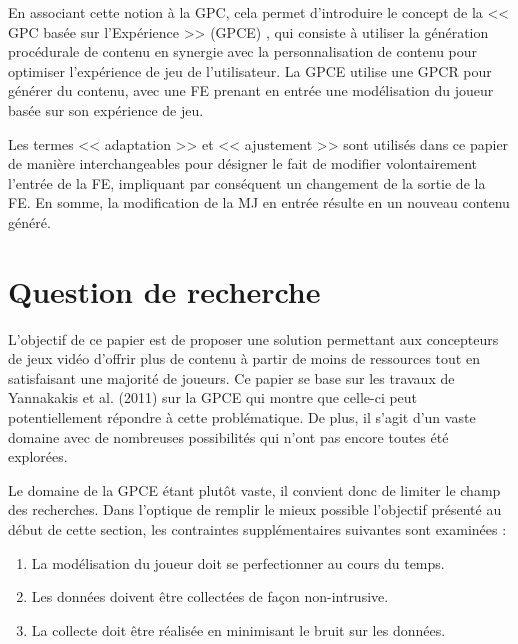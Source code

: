 \documentclass[a4paper,11pt]{article}
\begin{document}
        En associant cette notion à la GPC, cela permet d'introduire le concept de la << GPC basée sur l'Expérience >> (GPCE) \cite{Yannakakis}, qui consiste à utiliser la génération procédurale de contenu en synergie avec la personnalisation de contenu pour optimiser l'expérience de jeu de l'utilisateur. 
        La GPCE utilise une GPCR pour générer du contenu, avec une FE prenant en entrée une modélisation du joueur basée sur son expérience de jeu.
        
        Les termes << adaptation >> et << ajustement >> sont utilisés dans ce papier de manière interchangeables pour désigner le fait de modifier volontairement l'entrée de la FE, impliquant par conséquent un changement de la sortie de la FE.
        En somme, la modification de la MJ en entrée résulte en un nouveau contenu généré.
  
        
    \section{Question de recherche}\label{section:subject}

      L'objectif de ce papier est de proposer une solution permettant aux concepteurs de jeux vidéo d'offrir plus de contenu à partir de moins de ressources tout en satisfaisant une majorité de joueurs.
      Ce papier se base sur les travaux de Yannakakis et al. (2011) \cite{Yannakakis2} sur la GPCE qui montre que celle-ci peut potentiellement répondre à cette problématique.      
      De plus, il s'agit d'un vaste domaine \cite{Craveirinha} avec de nombreuses possibilités qui n'ont pas encore toutes été explorées.

      Le domaine de la GPCE étant plutôt vaste, il convient donc de limiter le champ des recherches.
      Dans l'optique de remplir le mieux possible l'objectif présenté au début de cette section, les contraintes supplémentaires suivantes sont examinées :
      \begin{enumerate}
        \item La modélisation du joueur doit se perfectionner au cours du temps.
        \item Les données doivent être collectées de façon non-intrusive.
        \item La collecte doit être réalisée en minimisant le bruit sur les données.
        \vspace{1em}
      \end{enumerate}
\end{document}
